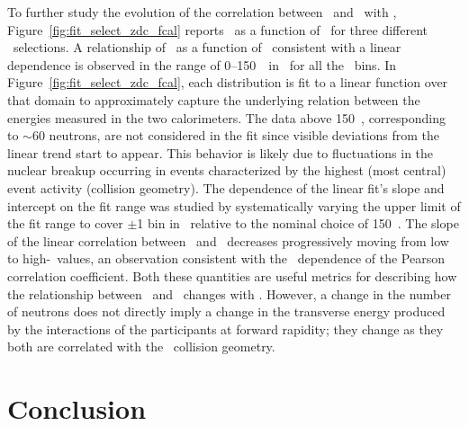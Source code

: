 \documentclass[PAPER, atlasdraft=false, USenglish, cernpreprint]{atlasdoc}
\begin{document}
To further study the evolution of the correlation between \ETPB\ and \EZDC\ with \xp, Figure~\ref{fig:fit_select_zdc_fcal} reports \EATPB\ as a function of \EZDC\ for three different \xp\ selections.
A 
relationship of \EATPB\ as a function of \EZDC\
consistent with a linear dependence is observed in the range of 0--150~\TeV\
in \EZDC\ for all the \xp\ bins.
In Figure~\ref{fig:fit_select_zdc_fcal}, each distribution is fit to a linear function over that domain to approximately capture the underlying relation between the energies measured in the two calorimeters.
The data above 150~\TeV, corresponding to $\sim$60 neutrons, are not considered in the fit since visible deviations from the linear trend 
start to appear.
This behavior is likely due to fluctuations in the nuclear breakup occurring in events characterized by the highest (most central) event activity (collision geometry).
The dependence of the linear fit's slope and intercept on the fit range was studied by systematically varying the upper limit of the fit range to cover $\pm$1 bin in \EZDC\ relative to the nominal choice of 150~\TeV.
The slope of the linear correlation between \EATPB\ and \EZDC\ decreases progressively moving from low to high-\xp\ values, an observation consistent with the \xp\ dependence of the Pearson correlation coefficient. Both these quantities are useful metrics for describing how the relationship between \EZDC\ and \ETPB\ changes with \xp.
However, a change in the number of neutrons does not directly imply a change in the transverse energy produced by the interactions of the participants at forward rapidity; they change as they both are correlated with the \pxPb\ collision geometry.













\clearpage
 \section{Conclusion}
\end{document}
